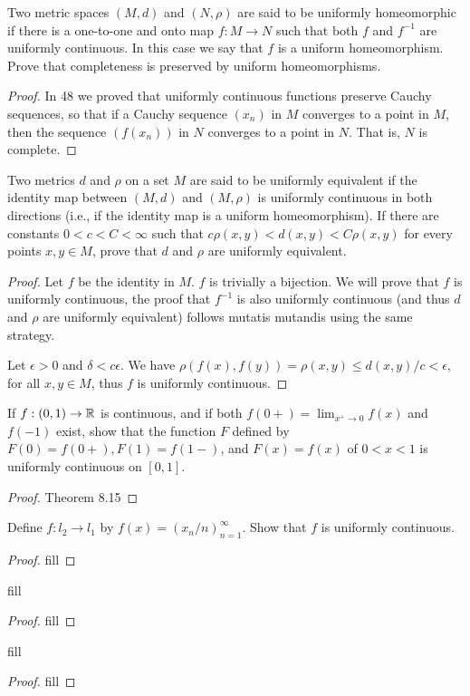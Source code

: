 \begin{exercise}{61}
Two metric spaces $(M,d)$ and $(N,\rho)$ are said to be uniformly homeomorphic if there is a one-to-one and onto map $f:M\to N$ such that both $f$ and $f^{-1}$ are uniformly continuous.
In this case we say that $f$ is a uniform homeomorphism.
Prove that completeness is preserved by uniform homeomorphisms.
\end{exercise}
\begin{proof}
In 48 we proved that uniformly continuous functions preserve Cauchy sequences, so that if a Cauchy sequence $(x_n)$ in $M$ converges to a point in $M$, then the sequence $(f(x_n))$ in $N$ converges to a point in $N$.
That is, $N$ is complete.
\end{proof} 

\begin{exercise}{62}
Two metrics $d$ and $\rho$ on a set $M$ are said to be uniformly equivalent if the identity map between $(M,d)$ and $(M,\rho)$ is uniformly continuous in both directions (i.e., if the identity map is a uniform homeomorphism).
If there are constants $0<c<C<\infty$ such that $c\rho(x,y)<d(x,y)<C\rho(x,y)$ for every points $x, y\in M$, prove that $d$ and $\rho$ are uniformly equivalent.
\end{exercise}
\begin{proof}
Let $f$ be the identity in $M$.
$f$ is trivially a bijection. 
We will prove that $f$ is uniformly continuous, the proof that $f^{-1}$ is also uniformly continuous (and thus $d$ and $\rho$ are uniformly equivalent) follows mutatis mutandis using the same strategy.

Let $\epsilon>0$ and $\delta<c\epsilon$.
We have $\rho(f(x),f(y)) = \rho(x,y) \leq d(x,y)/c < \epsilon$, for all $x,y\in M$, thus $f$ is uniformly continuous.
\end{proof} 

\begin{exercise}{65}
If $f:(0,1)\to\mathbb{R}$ is continuous, and if both $f(0+)=\lim_{x^+\to 0}f(x)$ and $f(-1)$ exist, show that the function $F$ defined by $F(0)=f(0+), F(1)=f(1-)$, and $F(x)=f(x)$ of $0<x<1$ is uniformly continuous on $[0,1]$.
\end{exercise}
\begin{proof}
Theorem 8.15
\end{proof} 

\begin{exercise}{67}
Define $f:l_2\to l_1$ by $f(x)=(x_n/n)_{n=1}^\infty$.
Show that $f$ is uniformly continuous.
\end{exercise}
\begin{proof}
fill
\end{proof} 

\begin{exercise}{69}
fill
\end{exercise}
\begin{proof}
fill
\end{proof} 

\begin{exercise}{70}
fill
\end{exercise}
\begin{proof}
fill
\end{proof} 
